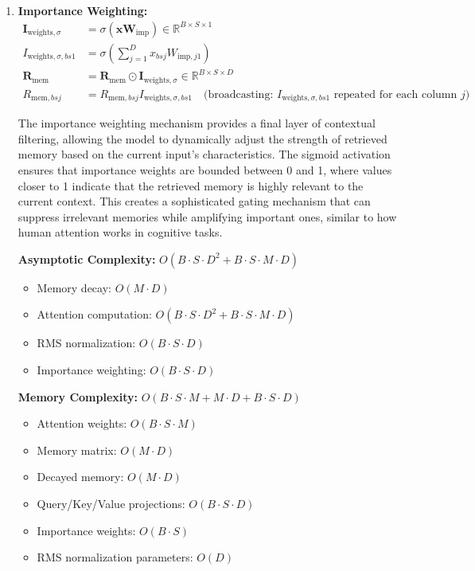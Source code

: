 \documentclass{article}
\begin{document}
\begin{enumerate}
The RMS normalization step ensures that the retrieved memory representations have consistent magnitude across different inputs and memory states, preventing the decay mechanism from causing numerical instabilities during training.
where $w_j$ is the learnable scale parameter and $\epsilon = 10^{-5}$ is a small constant for numerical stability.

\item \textbf{Importance Weighting:}
\begin{align}
\mathbf{I}_{\text{weights},\sigma} &= \sigma(\mathbf{x} \mathbf{W}_{\text{imp}}) \in \mathbb{R}^{B \times S \times 1} \\
I_{\text{weights},\sigma,bs1} &= \sigma\left(\sum_{j=1}^{D} x_{bsj} W_{\text{imp},j1}\right) \\
\mathbf{R}_{\text{mem}} &= \mathbf{R}_{\text{mem}} \odot \mathbf{I}_{\text{weights},\sigma} \in \mathbb{R}^{B \times S \times D} \\
R_{\text{mem},bsj} &= R_{\text{mem},bsj} I_{\text{weights},\sigma,bs1} \quad \text{(broadcasting: $I_{\text{weights},\sigma,bs1}$ repeated for each column $j$)}
\end{align}

The importance weighting mechanism provides a final layer of contextual filtering, allowing the model to dynamically adjust the strength of retrieved memory based on the current input's characteristics. The sigmoid activation ensures that importance weights are bounded between 0 and 1, where values closer to 1 indicate that the retrieved memory is highly relevant to the current context. This creates a sophisticated gating mechanism that can suppress irrelevant memories while amplifying important ones, similar to how human attention works in cognitive tasks.

\textbf{Asymptotic Complexity:} $O(B \cdot S \cdot D^2 + B \cdot S \cdot M \cdot D)$
\begin{itemize}
\item Memory decay: $O(M \cdot D)$
\item Attention computation: $O(B \cdot S \cdot D^2 + B \cdot S \cdot M \cdot D)$
\item RMS normalization: $O(B \cdot S \cdot D)$
\item Importance weighting: $O(B \cdot S \cdot D)$
\end{itemize}

\textbf{Memory Complexity:} $O(B \cdot S \cdot M + M \cdot D + B \cdot S \cdot D)$
\begin{itemize}
\item Attention weights: $O(B \cdot S \cdot M)$
\item Memory matrix: $O(M \cdot D)$
\item Decayed memory: $O(M \cdot D)$
\item Query/Key/Value projections: $O(B \cdot S \cdot D)$
\item Importance weights: $O(B \cdot S)$
\item RMS normalization parameters: $O(D)$
\end{itemize}
\end{enumerate}
\end{document}
